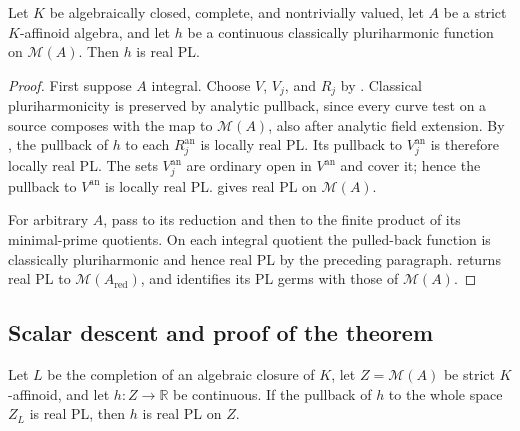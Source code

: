 \begin{proposition}\label{prop:supplied-p061-algebraically-closed-case}
Let $K$ be algebraically closed, complete, and nontrivially valued, let $A$ be a strict $K$-affinoid algebra, and let $h$ be a continuous classically pluriharmonic function on $\mathcal M(A)$. Then $h$ is real PL.
\end{proposition}

\begin{proof}
First suppose $A$ integral. Choose $V$, $V_j$, and $R_j$ by . Classical pluriharmonicity is preserved by analytic pullback, since every curve test on a source composes with the map to $\mathcal M(A)$, also after analytic field extension. By , the pullback of $h$ to each $R_j^{\mathrm{an}}$ is locally real PL. Its pullback to $V_j^{\mathrm{an}}$ is therefore locally real PL. The sets $V_j^{\mathrm{an}}$ are ordinary open in $V^{\mathrm{an}}$ and cover it; hence the pullback to $V^{\mathrm{an}}$ is locally real PL.  gives real PL on $\mathcal M(A)$.

For arbitrary $A$, pass to its reduction and then to the finite product of its minimal-prime quotients. On each integral quotient the pulled-back function is classically pluriharmonic and hence real PL by the preceding paragraph.  returns real PL to $\mathcal M(A_{\mathrm{red}})$, and  identifies its PL germs with those of $\mathcal M(A)$.
\end{proof}

\subsection{Scalar descent and proof of the theorem}\label{sec:supplied-p061-scalar-descent}

\begin{proposition}\label{prop:supplied-p061-completed-algebraic-descent}
Let $L$ be the completion of an algebraic closure of $K$, let $Z=\mathcal M(A)$ be strict $K$-affinoid, and let $h:Z\to\mathbb R$ be continuous. If the pullback of $h$ to the whole space $Z_L$ is real PL, then $h$ is real PL on $Z$.
\end{proposition}

